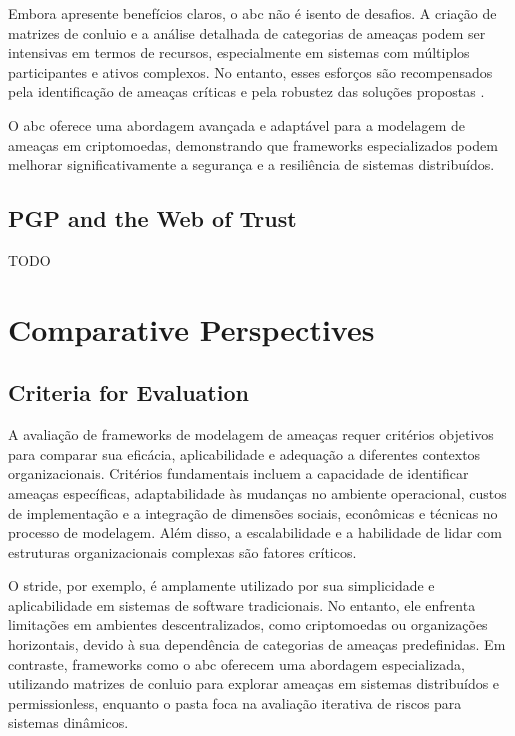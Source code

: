 Embora apresente benefícios claros, o \gls{abc} não é isento de desafios. A
criação de matrizes de conluio e a análise detalhada de categorias de
ameaças podem ser intensivas em termos de recursos, especialmente em
sistemas com múltiplos participantes e ativos complexos. No entanto,
esses esforços são recompensados pela identificação de ameaças
críticas e pela robustez das soluções propostas \cite{AbcCrypto}.

O \gls{abc} oferece uma abordagem avançada e adaptável para a modelagem de
ameaças em criptomoedas, demonstrando que frameworks especializados
podem melhorar significativamente a segurança e a resiliência de
sistemas distribuídos.


\subsection{PGP and the Web of Trust}
\label{subsec:pgp_web_of_trust}
TODO

\section{Comparative Perspectives}
\label{sec:comparative_perspectives}

\subsection{Criteria for Evaluation}
\label{subsec:criteria_evaluation}

A avaliação de frameworks de modelagem de ameaças requer critérios
objetivos para comparar sua eficácia, aplicabilidade e adequação a
diferentes contextos organizacionais. Critérios fundamentais incluem a
capacidade de identificar ameaças específicas, adaptabilidade às
mudanças no ambiente operacional, custos de implementação e a
integração de dimensões sociais, econômicas e técnicas no processo de
modelagem. Além disso, a escalabilidade e a habilidade de lidar com
estruturas organizacionais complexas são fatores críticos.

O \gls{stride}, por exemplo, é amplamente utilizado por sua simplicidade e
aplicabilidade em sistemas de software tradicionais. No entanto, ele
enfrenta limitações em ambientes descentralizados, como criptomoedas
ou organizações horizontais, devido à sua dependência de categorias de
ameaças predefinidas. Em contraste, frameworks como
o \gls{abc} oferecem uma abordagem especializada,
utilizando matrizes de conluio para explorar ameaças em
sistemas distribuídos e permissionless, enquanto o \gls{pasta} foca na
avaliação iterativa de riscos para sistemas dinâmicos.

